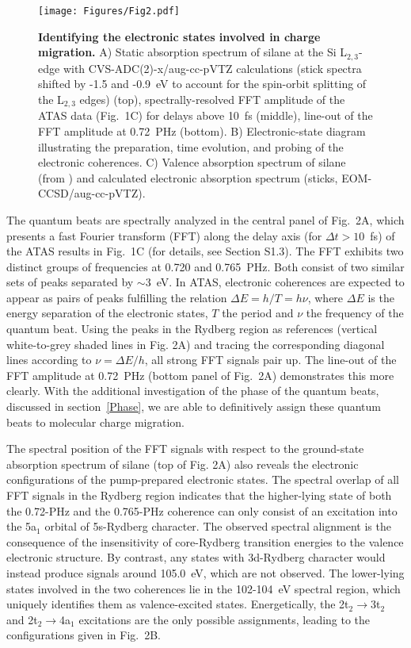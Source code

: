 \documentclass[12pt]{article}
\begin{document}
%
\begin{figure}
    \centering
    \texttt{[image: Figures/Fig2.pdf]}
    \caption{
    \textbf{Identifying the electronic states involved in charge migration.} A) Static absorption spectrum of silane at the Si L$_{2,3}$-edge with CVS-ADC(2)-x/aug-cc-pVTZ calculations (stick spectra shifted by -1.5 and -0.9~eV to account for the spin-orbit splitting of the L$_{2,3}$ edges) (top), spectrally-resolved FFT amplitude of the ATAS data (Fig.~1C) for delays above 10~fs (middle), line-out of the FFT amplitude at 0.72~PHz (bottom). B) Electronic-state diagram illustrating the preparation, time evolution, and probing of the electronic coherences. C) Valence absorption spectrum of silane (from \cite{Cooper95}) and calculated electronic absorption spectrum (sticks, EOM-CCSD/aug-cc-pVTZ). 
    }
\end{figure}
%
The quantum beats are spectrally analyzed in the central panel of Fig.~2A, which presents a fast Fourier transform (FFT) along the delay axis (for $\Delta t > 10$~fs) of the ATAS results in Fig.~1C (for details, see Section S1.3). The FFT exhibits two distinct groups of frequencies at 0.720 and 0.765~PHz. Both consist of two similar sets of peaks separated by $\sim$3~eV.
In ATAS, electronic coherences are expected to appear as pairs of peaks fulfilling the relation $\Delta E=h/T=h\nu$, where $\Delta E$ is the energy separation of the electronic states, $T$ the period and $\nu$ the frequency of the quantum beat. Using the peaks in the Rydberg region as references (vertical white-to-grey shaded lines in Fig. 2A) and tracing the corresponding diagonal lines according to $\nu=\Delta E/h$, all strong FFT signals pair up. The line-out of the FFT amplitude at 0.72~PHz (bottom panel of Fig.~2A) demonstrates this more clearly. With the additional investigation of the phase of the quantum beats, discussed in section~\ref{Phase}, we are able to definitively assign these quantum beats to molecular charge migration.

The spectral position of the FFT signals with respect to the ground-state absorption spectrum of silane (top of Fig. 2A) also reveals the electronic configurations of the pump-prepared electronic states. 
The spectral overlap of all FFT signals in the Rydberg region indicates that the higher-lying state of both the 0.72-PHz and the 0.765-PHz coherence can only consist of an excitation into the 5a$_1$ orbital of 5s-Rydberg character. The observed spectral alignment is the consequence of the insensitivity of core-Rydberg transition energies to the valence electronic structure. 
By contrast, any states with 3d-Rydberg character would instead produce signals around 105.0~eV, which are not observed. The lower-lying states involved in the two coherences lie in the 102-104~eV spectral region, which uniquely identifies them as valence-excited states. Energetically, the 2t$_2\rightarrow$3t$_2$ and 2t$_2\rightarrow$4a$_1$ excitations are the only possible assignments, leading to the configurations given in Fig.~2B.
\end{document}

